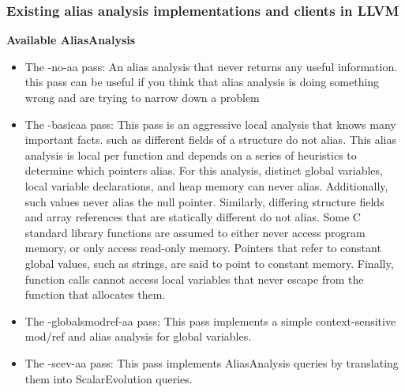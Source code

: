 \subsubsection{Existing alias analysis implementations and clients in LLVM}


\textbf{\large Available AliasAnalysis}

\begin{itemize}
 \item The -no-aa pass: An alias analysis that never returns any useful information. this pass can
 be useful if you think that alias analysis is doing something wrong and are trying to narrow
 down a problem
 \item The -basicaa pass: This pass is an aggressive local analysis that knows many important facts.
 such as different fields of a structure do not alias. This alias analysis is local per function and
 depends on a series of heuristics to determine which pointers alias. For this analysis,
 distinct global variables, local variable declarations, and heap memory can never
 alias. Additionally, such values never alias the null pointer. Similarly, differing
 structure fields and array references that are statically different do not alias. Some
 C standard library functions are assumed to either never access program memory, or
 only access read-only memory. Pointers that refer to constant global values, such as
 strings, are said to point to constant memory. Finally, function calls cannot access
 local variables that never escape from the function that allocates them.\cite{AnEmpiri85:online}
 \item The -globalsmodref-aa pass: This pass implements a simple context-sensitive mod/ref and
 alias analysis for global variables.
 \item  The -scev-aa pass: This pass implements AliasAnalysis queries by translating them into
 ScalarEvolution queries.
    
\end{itemize}    




